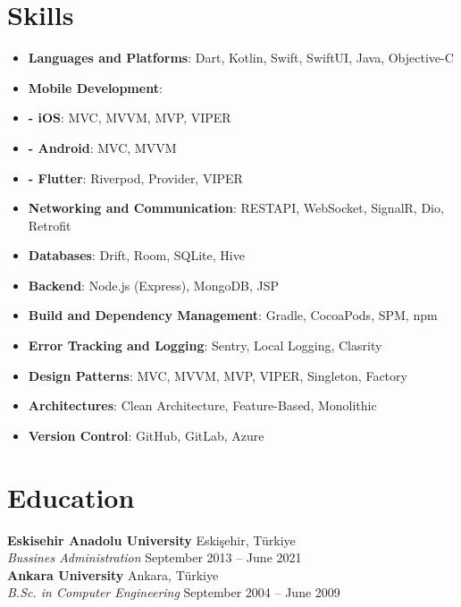 \documentclass[10pt,a4paper]{extarticle}
\begin{document}
\section{Skills}
\begin{itemize}[leftmargin=*,noitemsep,topsep=0pt]
	\item \textbf{Languages and Platforms}: Dart, Kotlin, Swift, SwiftUI, Java, Objective-C
	\item \textbf{Mobile Development}: 
 	\item \textbf{- iOS}: MVC, MVVM, MVP, VIPER
  	\item \textbf{- Android}: MVC, MVVM
  	\item \textbf{- Flutter}: Riverpod, Provider, VIPER
	\item \textbf{Networking and Communication}: RESTAPI, WebSocket, SignalR, Dio, Retrofit
	\item \textbf{Databases}: Drift, Room, SQLite, Hive
	\item \textbf{Backend}: Node.js (Express), MongoDB, JSP
	\item \textbf{Build and Dependency Management}: Gradle, CocoaPods, SPM, npm
	\item \textbf{Error Tracking and Logging}: Sentry, Local Logging, Clasrity
	\item \textbf{Design Patterns}: MVC, MVVM, MVP, VIPER, Singleton, Factory
	\item \textbf{Architectures}: Clean Architecture, Feature-Based, Monolithic
	\item \textbf{Version Control}: GitHub, GitLab, Azure
\end{itemize}
\section{Education}
\textbf{Eskisehir Anadolu University} \hfill Eskişehir, Türkiye\\
\textit{Bussines Administration} \hfill September 2013 -- June 2021\\
\textbf{Ankara University} \hfill Ankara, Türkiye\\
\textit{B.Sc. in Computer Engineering} \hfill September 2004 -- June 2009\\
\end{document}
